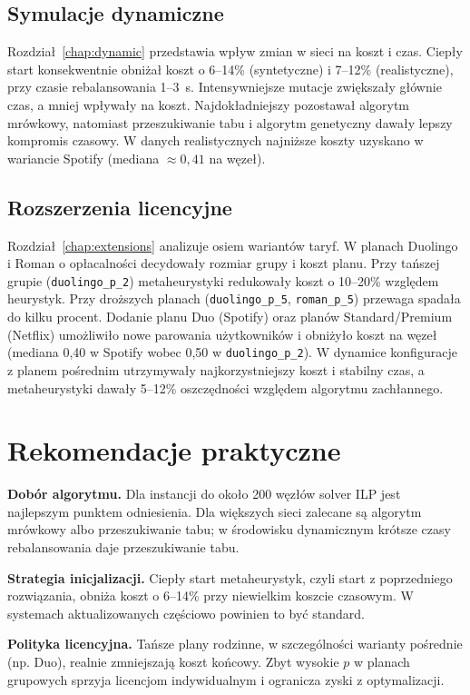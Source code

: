 \subsection{Symulacje dynamiczne}
Rozdział~\ref{chap:dynamic} przedstawia wpływ zmian w sieci na koszt i czas. Ciepły start konsekwentnie obniżał koszt o 6--14\% (syntetyczne) i 7--12\% (realistyczne), przy czasie rebalansowania 1--3~s. Intensywniejsze mutacje zwiększały głównie czas, a mniej wpływały na koszt. Najdokładniejszy pozostawał algorytm mrówkowy, natomiast przeszukiwanie tabu i algorytm genetyczny dawały lepszy kompromis czasowy. W danych realistycznych najniższe koszty uzyskano w wariancie Spotify (mediana $\approx 0{,}41$ na węzeł).

\subsection{Rozszerzenia licencyjne}
Rozdział~\ref{chap:extensions} analizuje osiem wariantów taryf. W planach Duolingo i Roman o opłacalności decydowały rozmiar grupy i koszt planu. Przy tańszej grupie (\texttt{duolingo\_p\_2}) metaheurystyki redukowały koszt o 10--20\% względem heurystyk. Przy droższych planach (\texttt{duolingo\_p\_5}, \texttt{roman\_p\_5}) przewaga spadała do kilku procent. Dodanie planu Duo (Spotify) oraz planów Standard/Premium (Netflix) umożliwiło nowe parowania użytkowników i obniżyło koszt na węzeł (mediana 0{,}40 w Spotify wobec 0{,}50 w \texttt{duolingo\_p\_2}). W dynamice konfiguracje z planem pośrednim utrzymywały najkorzystniejszy koszt i stabilny czas, a metaheurystyki dawały 5--12\% oszczędności względem algorytmu zachłannego.

\section{Rekomendacje praktyczne}

\textbf{Dobór algorytmu.} Dla instancji do około 200 węzłów solver ILP jest najlepszym punktem odniesienia. Dla większych sieci zalecane są algorytm mrówkowy albo przeszukiwanie tabu; w środowisku dynamicznym krótsze czasy rebalansowania daje przeszukiwanie tabu.

\textbf{Strategia inicjalizacji.} Ciepły start metaheurystyk, czyli start z poprzedniego rozwiązania, obniża koszt o 6--14\% przy niewielkim koszcie czasowym. W systemach aktualizowanych częściowo powinien to być standard.

\textbf{Polityka licencyjna.} Tańsze plany rodzinne, w szczególności warianty pośrednie (np. Duo), realnie zmniejszają koszt końcowy. Zbyt wysokie $p$ w planach grupowych sprzyja licencjom indywidualnym i ogranicza zyski z optymalizacji.


